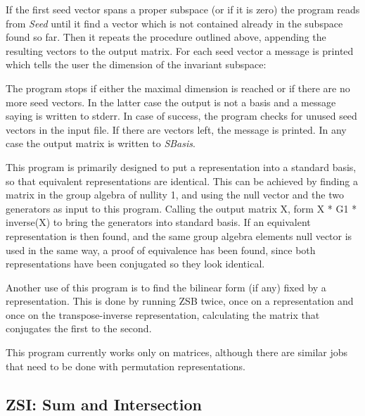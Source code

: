 If the first seed vector spans a proper subspace (or if it is
zero) the program reads from {\it Seed} until it find a vector
which is not contained already in the subspace found so far.
Then it repeats the procedure outlined above, appending the resulting
vectors to the output matrix.
For each seed vector a message is printed which tells the
user the dimension of the invariant subspace:

The program stops if either the maximal dimension is reached or
if there are no more seed vectors. In the latter case the output
is not a basis and a message saying
is written to stderr. In case of success, the program checks
for unused seed vectors in the input file. If there are vectors
left, the message
is printed. In any case the output matrix is written to
{\it SBasis}.

This program is primarily designed to put a representation into a
standard basis, so that equivalent representations are identical. This
can be achieved by finding a matrix in the group algebra of nullity 1,
and using the null vector and the two generators as input to this
program. Calling the output matrix X, form X * G1 * inverse(X) to
bring the generators into standard basis.
If an equivalent representation is then
found, and the same group algebra elements null vector is used in the
same way, a proof of equivalence has been found, since both
representations have been conjugated so they look identical.

Another use of this program is to find the bilinear form (if any)
fixed by a representation. This is done by running ZSB twice, once on
a representation and once on the transpose-inverse representation,
calculating the matrix that conjugates the first to the second.


\Limits
This program currently works only on matrices, although there are
similar jobs that need to be done with permutation representations.


\subsection{ZSI: Sum and Intersection}
\Syntax
{}

